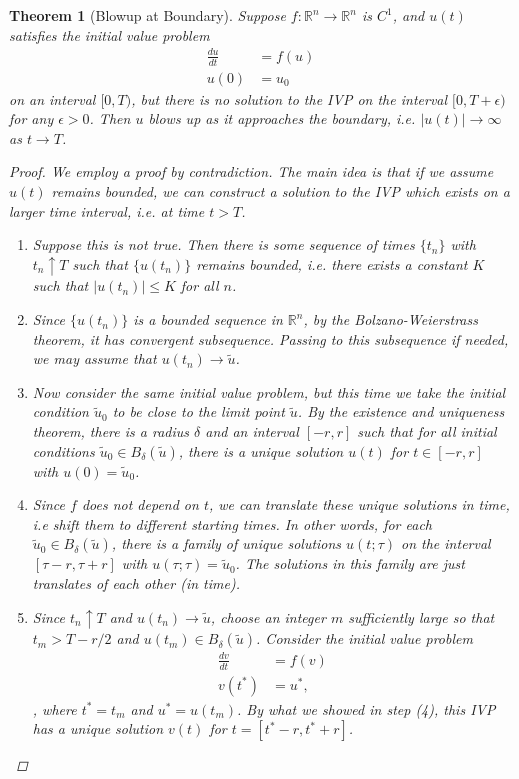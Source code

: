 \documentclass[12pt]{amsart}         %
\newtheorem{theorem}{Theorem}[section]
\theoremstyle{remark}
\newcommand{\R}{\mathbb{R}}
\begin{document}
\begin{theorem}[Blowup at Boundary]
Suppose $f: \R^n \rightarrow \R^n$ is $C^1$, and $u(t)$ satisfies the initial value problem
\begin{align*}
\frac{du}{dt} &= f(u) \\
u(0) &= u_0 
\end{align*}
on an interval $[0, T)$, but there is no solution to the IVP on the interval $[0, T + \epsilon)$ for any $\epsilon > 0$. Then $u$ blows up as it approaches the boundary, i.e. $|u(t)| \rightarrow \infty$ as $t \rightarrow T$.

\begin{proof}
We employ a proof by contradiction. The main idea is that if we assume $u(t)$ remains bounded, we can construct a solution to the IVP which exists on a larger time interval, i.e. at time $t > T$.
\begin{enumerate}
\item Suppose this is not true. Then there is some sequence of times $\{t_n\}$ with $t_n \uparrow T$ such that $\{ u(t_n) \}$ remains bounded, i.e. there exists a constant $K$ such that $|u(t_n)| \leq K$ for all $n$.

\item Since $\{ u(t_n) \}$ is a bounded sequence in $\R^n$, by the Bolzano-Weierstrass theorem, it has convergent subsequence. Passing to this subsequence if needed, we may assume that $u(t_n) \rightarrow \tilde{u}$.

\item Now consider the same initial value problem, but this time we take the initial condition $\tilde{u}_0$ to be close to the limit point $\tilde{u}$. By the existence and uniqueness theorem, there is a radius $\delta$ and an interval $[-r, r]$ such that for all initial conditions $\tilde{u}_0 \in B_\delta(\tilde{u})$, there is a unique solution $u(t)$ for $t \in [-r, r]$ with $u(0) = \tilde{u}_0$. 

\item Since $f$ does not depend on $t$, we can translate these unique solutions in time, i.e shift them to different starting times.  In other words, for each $\tilde{u}_0 \in B_\delta(\tilde{u})$, there is a family of unique solutions $u(t; \tau)$ on the interval $[\tau - r, \tau + r]$ with $u(\tau; \tau) = \tilde{u}_0$. The solutions in this family are just translates of each other (in time).

\item Since $t_n \uparrow T$ and $u(t_n) \rightarrow \tilde{u}$, choose an integer $m$ sufficiently large so that $t_m > T - r/2$ and
$u(t_m) \in B_\delta(\tilde{u})$. Consider the initial value problem
\begin{align*}
\frac{dv}{dt} &= f(v) \\
v(t^*) &= u^*,
\end{align*}, 
where $t^* = t_m$ and $u^* = u(t_m)$. By what we showed in step (4), this IVP has a unique solution $v(t)$ for $t = [t^* - r, t^* + r]$.


\end{enumerate}
\end{proof}
\end{theorem}
\end{document}
